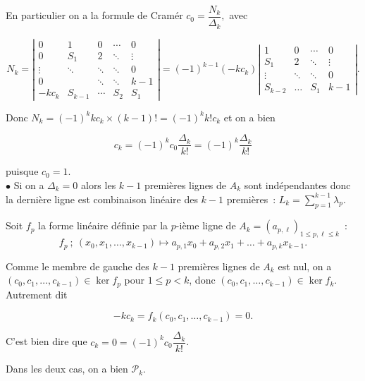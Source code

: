 \begin{enumerate}
En particulier on a la formule de Cramér 
\( c_0 = \dfrac{N_k}{\Delta_k}, \) avec 
 
\[ N_k = \left|\begin{array}{ccccc}
0 & {1} & {0} & {\cdots} & {0} \\
0 & S_1 & {2} & {\ddots} & {\vdots} \\
{\vdots} & {\ddots} & {\ddots} & {\ddots} & {0} \\
0 & {} & {\ddots} & {\ddots} & {k-1} \\
-kc_k & S_{k-1} & {\cdots} & S_2 & S_1
\end{array}\right| = (-1)^{k-1}(-kc_k)\left|\begin{array}{cccc}
 {1} & {0} & {\cdots} & {0} \\
 S_1 & {2} & {\ddots} & {\vdots} \\
{\vdots}  & {\ddots} & {\ddots} & {0} \\
 S_{k-2} & {\ldots} & S_1 & {k-1} 
\end{array}\right|.  \]
 
Donc \( N_k = (-1)^{k}kc_k\times(k-1)! = (-1)^{k}k!c_k \) et on a bien 
 
\[ c_k = (-1)^{k}c_0\dfrac{\Delta_k}{k!} = (-1)^{k}\dfrac{\Delta_k}{k!} \]
 
puisque \( c_0 = 1 \).\\
 

 
\( \bullet \) Si on a \( \Delta_k = 0 \) alors les \( k-1 \) premières lignes de \( A_k \) sont indépendantes donc la dernière ligne est combinaison linéaire des \( k-1 \) premières~: \( L_k = \sum\limits_{p=1}^{k-1} \lambda_p \). 
 
Soit \( f_p \) la forme linéaire définie par la \( p \)-ième ligne de \( A_k = (a_{p,\ell})_{1\leqslant p,\ell \leqslant k} \)~:
\[ f_p~;~(x_0,x_1, \ldots, x_{k-1}) \longmapsto  a_{p,1}x_0 + a_{p,2}x_1 + \ldots + a_{p,k}x_{k-1}. \]
 
Comme le membre de gauche des \( k-1 \) premières lignes de \( A_k \) est nul, on a
\( (c_0,c_1, \ldots, c_{k-1}) \in \ker f_p \) pour \( 1\leqslant p < k \), 
donc \( (c_0,c_1, \ldots, c_{k-1}) \in \ker f_k \). Autrement dit 
 
\[ -kc_k = f_k(c_0,c_1, \ldots, c_{k-1}) = 0. \]
 
C'est bien dire que \( c_k = 0 = (-1)^{k}c_0\dfrac{\Delta_k}{k!} \).
 

 
Dans les deux cas, on a bien \( \mathcal P_{k} \).
 


\end{enumerate}
